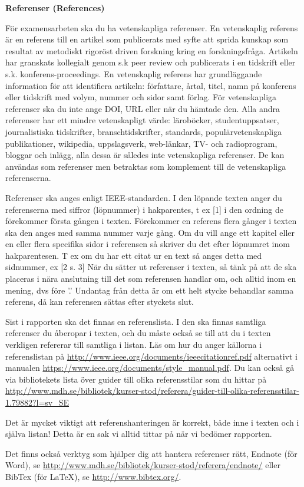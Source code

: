 \textbf{Referenser (References)}

F\"or examensarbeten ska du ha vetenskapliga referenser. En vetenskaplig referens \"ar en referens till en artikel som publicerats med syfte att sprida kunskap som resultat av metodiskt rigor\"ost driven forskning kring en forskningsfr\r{a}ga. Artikeln har granskats kollegialt genom s.k peer review och publicerats i en tidskrift eller s.k. konferens-proceedings. En vetenskaplig referens har grundl\"aggande information f\"or att identifiera artikeln: f\"orfattare, \r{a}rtal, titel, namn p\r{a} konferens eller tidskrift med volym, nummer och sidor samt f\"orlag. F\"or vetenskapliga referenser ska du inte ange DOI, URL eller n\"ar du h\"amtade den. Alla andra referenser har ett mindre vetenskapligt v\"arde: l\"arob\"ocker, studentuppsatser, journalistiska tidskrifter, branschtidskrifter, standards, popul\"arvetenskapliga publikationer, wikipedia, uppslagsverk, web-l\"ankar, TV- och radioprogram, bloggar och inl\"agg, alla dessa \"ar s\r{a}ledes inte vetenskapliga referenser. De kan anv\"andas som referenser men betraktas som komplement till de vetenskapliga referenserna.

Referenser ska anges enligt IEEE-standarden. I den l\"opande texten anger du referenserna med siffror (l\"opnummer) i hakparentes, t ex [1] i den ordning de f\"orekommer f\"orsta g\r{a}ngen i texten. F\"orekommer en referens flera g\r{a}nger i texten ska den anges med samma nummer varje g\r{a}ng. Om du vill ange ett kapitel eller en eller flera specifika sidor i referensen s\r{a} skriver du det efter l\"opnumret inom hakparentesen. T ex om du har ett citat ur en text s\r{a} anges detta med sidnummer, ex [2 s. 3]
N\"ar du s\"atter ut referenser i texten, s\r{a} t\"ank p\r{a} att de ska placeras i n\"ara anslutning till det som referensen handlar om, och alltid inom en mening, dvs f\"ore ’.’ Undantag fr\r{a}n detta \"ar om ett helt stycke behandlar samma referens, d\r{a} kan referensen s\"attas efter styckets slut.

Sist i rapporten ska det finnas en referenslista. I den ska finnas samtliga referenser du \r{a}beropar i texten, och du m\r{a}ste ocks\r{a} se till att du i texten verkligen refererar till samtliga i listan. L\"as om hur du anger k\"allorna i referenslistan p\r{a} \url{http://www.ieee.org/documents/ieeecitationref.pdf} alternativt i manualen \url{https://www.ieee.org/documents/style_manual.pdf}. Du kan ocks\r{a} g\r{a} via bibliotekets lista \"over guider till olika referensstilar som du hittar p\r{a} \url{http://www.mdh.se/bibliotek/kurser-stod/referera/guider-till-olika-referensstilar-1.79882?l=sv_SE}

Det \"ar mycket viktigt att referenshanteringen \"ar korrekt, b\r{a}de inne i texten och i sj\"alva listan! Detta \"ar en sak vi alltid tittar p\r{a} n\"ar vi bed\"omer rapporten. 

Det finns ocks\r{a} verktyg som hj\"alper dig att hantera referenser r\"att, Endnote (f\"or Word), se \url{http://www.mdh.se/bibliotek/kurser-stod/referera/endnote/} eller BibTex (f\"or LaTeX), se \url{http://www.bibtex.org/}.




